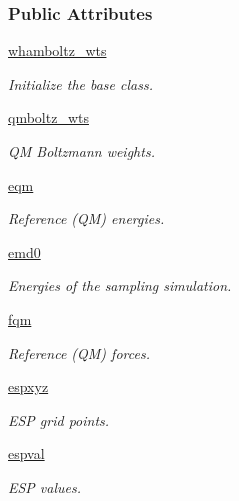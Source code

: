 \subsubsection*{\-Public \-Attributes}
\begin{DoxyCompactItemize}
\item 
\hyperlink{classforcebalance_1_1abinitio_1_1AbInitio_ae5c60f421336c2ecb716be16b8d51fdf}{whamboltz\-\_\-wts}
\begin{DoxyCompactList}\small\item\em \-Initialize the base class. \end{DoxyCompactList}\item 
\hyperlink{classforcebalance_1_1abinitio_1_1AbInitio_a5d7019720cce40eb336b82b5d0c74f87}{qmboltz\-\_\-wts}
\begin{DoxyCompactList}\small\item\em \-Q\-M \-Boltzmann weights. \end{DoxyCompactList}\item 
\hyperlink{classforcebalance_1_1abinitio_1_1AbInitio_a621b8b2fb62435de36c6895ba6ea09aa}{eqm}
\begin{DoxyCompactList}\small\item\em \-Reference (\-Q\-M) energies. \end{DoxyCompactList}\item 
\hyperlink{classforcebalance_1_1abinitio_1_1AbInitio_a975f07dd65ff96266fbd9fe2d9683ab3}{emd0}
\begin{DoxyCompactList}\small\item\em \-Energies of the sampling simulation. \end{DoxyCompactList}\item 
\hyperlink{classforcebalance_1_1abinitio_1_1AbInitio_a6b773c8a8a0134fdb4773eff6b23a4b9}{fqm}
\begin{DoxyCompactList}\small\item\em \-Reference (\-Q\-M) forces. \end{DoxyCompactList}\item 
\hyperlink{classforcebalance_1_1abinitio_1_1AbInitio_ae86f6ee41ce05057b44fb1bc8bb1282b}{espxyz}
\begin{DoxyCompactList}\small\item\em \-E\-S\-P grid points. \end{DoxyCompactList}\item 
\hyperlink{classforcebalance_1_1abinitio_1_1AbInitio_a011b973a1779275fe19fd1c72037b435}{espval}
\begin{DoxyCompactList}\small\item\em \-E\-S\-P values. \end{DoxyCompactList}\item 

\end{DoxyCompactItemize}

